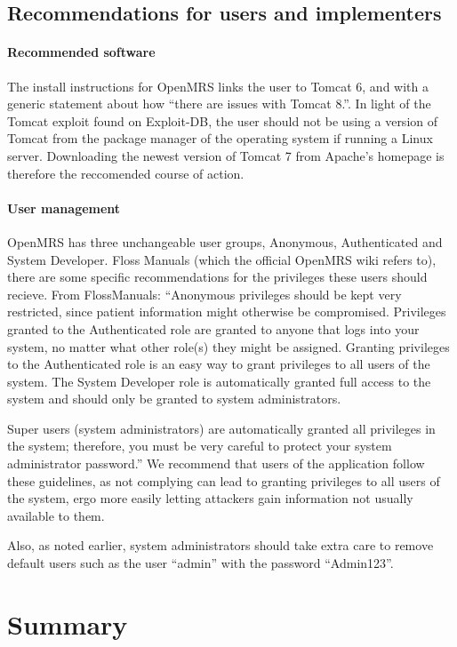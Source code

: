 \documentclass{report} %
\begin{document}
\subsection{Recommendations for users and implementers}
\paragraph{Recommended software}
The install instructions for OpenMRS links the user to Tomcat 6, and with a
generic statement about how ``there are issues with Tomcat 8.''. In light of the
Tomcat exploit found on Exploit-DB, the user should not be using a version of Tomcat
from the package manager of the operating system if running a Linux server.
Downloading the newest version of Tomcat 7 from Apache's homepage is therefore
the reccomended course of action.

\paragraph{User management}
OpenMRS has three unchangeable user groups, Anonymous, Authenticated and System
Developer. Floss Manuals (which the official OpenMRS wiki refers to), there are
some specific recommendations for the privileges these users should recieve.
From FlossManuals: ``Anonymous privileges should be kept very restricted, since patient
information might otherwise be compromised. Privileges granted to the
Authenticated role are granted to anyone that logs into your system, no matter
what other role(s) they might be assigned. Granting privileges to the
Authenticated role is an easy way to grant privileges to all users of the
system. The System Developer role is automatically granted full access to the
system and should only be granted to system administrators.

Super users (system administrators) are automatically granted all privileges
in the system; therefore, you must be very careful to protect your system
administrator password.'' \autocite[]{FLOSS}
We recommend that users of the application follow these guidelines, as not
complying can lead to granting privileges to all users of the system, ergo more
easily letting attackers gain information not usually available to them.

Also, as noted earlier, system administrators should take extra care to remove
default users such as the user ``admin'' with the password ``Admin123''.

\section{Summary}
\end{document}
